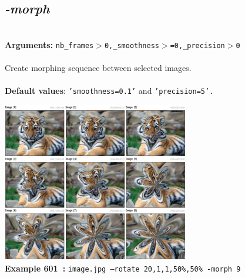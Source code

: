 \documentclass[a4paper,11pt,twoside]{book}
\begin{document}
\subsection{\emph{-morph} }\vspace*{-0.5em}
~\\\textbf{Arguments: } 
{\small \texttt{nb\_frames$>$0,\_smoothness$>$=0,\_precision$>$0}}\\~\\
Create morphing sequence between selected images.
~\\~\\\textbf{Default values}: {\small \texttt{'smoothness=0.1'} and \texttt{'precision=5'.}}
\begin{center}\includegraphics[keepaspectratio=true,height=7cm,width=\textwidth]{img/gmic_def601.jpg}\\
{\footnotesize \textbf{Example 601~:} \texttt{image.jpg --rotate 20,1,1,50\%,50\% -morph 9}}
\end{center}
\end{document}
